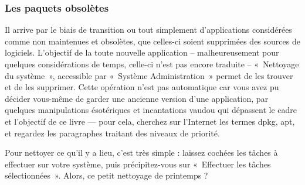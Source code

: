 \subsubsection{Les paquets obsolètes}
\label{RefCleaner}
Il arrive par le biais de transition ou tout simplement d'applications considérées comme non maintenues et obsolètes, que celles-ci soient supprimées des sources de logiciels. L'objectif de la toute nouvelle application -- malheureusement pour quelques considérations de temps, celle-ci n'est pas encore traduite -- «~Nettoyage du système~», accessible par «~Système \FlecheDroite Administration~» permet de les trouver et de les supprimer. Cette opération n'est pas automatique car vous avez pu décider vous-même de garder une ancienne version d'une application, par quelques manipulations ésotériques et incantations vaudou qui dépassent le cadre et l'objectif de ce livre --- pour cela, cherchez sur l'Internet les termes dpkg, apt, et regardez les paragraphes traitant des niveaux de priorité.\par
Pour nettoyer ce qu'il y a lieu, c'est très simple : laissez cochées les tâches à effectuer sur votre système, puis précipitez-vous sur «~Effectuer les tâches sélectionnées~». Alors, ce petit nettoyage de printemps ?
